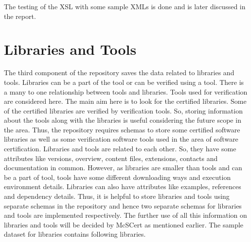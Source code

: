 \documentclass[11pt,letterpaper]{report}
\begin{document}
\bigskip

The testing of the XSL with some sample XMLs is done and is later discussed in the report. 

\chapter{Libraries and Tools}
\label{chap:CLT}
The third component of the repository saves the data related to libraries and tools. Libraries can be a part of the tool or can be verified using a tool. There is a many to one relationship between tools and libraries. Tools used for verification are considered here. The main aim here is to look for the certified libraries. Some of the certified libraries are verified by verification tools. So, storing information about the tools along with the libraries is useful considering the future scope in the area. Thus, the repository requires schemas to store some certified software libraries as well as some verification software tools used in the area of software certification. Libraries and tools are related to each other. So, they have some attributes like versions, overview, content files, extensions, contacts and documentation in common. However, as libraries are smaller than tools and can be a part of tool, tools have some different downloading ways and execution environment details. Libraries can also have attributes like examples, references and dependency details. Thus, it is helpful to store libraries and tools using separate schemas in the repository and hence two separate schemas for libraries and tools are implemented respectively. The further use of all this information on libraries and tools will be decided by McSCert \cite{McCert} as mentioned earlier.   
The sample dataset for libraries contains following libraries. 
\end{document}
